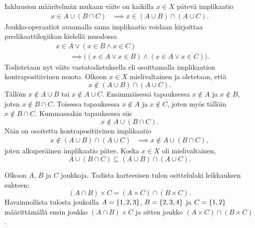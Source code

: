 \documentclass[12pt,a4paper]{article}
\begin{document}
\begin{solution}
Inkluusion määritelmän mukaan väite on kaikilla \(x \in X\) pätevä implikaatio
\[
\begin{aligned}
x \in A \cup (B \cap C)
&\implies x \in (A \cup B) \cap (A \cup C).
\end{aligned}
\]
Joukko-operaatiot avaamalla sama implikaatio voidaan kirjoittaa
predikaattilogiikan kielellä muodossa
\[
\begin{aligned}
&x \in A \lor (x \in B \land x \in C) \\
&\qquad\implies
\bigl((x \in A \lor x \in B) \land (x \in A \lor x \in C)\bigr).
\end{aligned}
\]
Todistetaan nyt väite vastatodistuksella eli osoittamalla implikaation
kontrapositiivinen muoto. Olkoon \(x \in X\) mielivaltainen ja oletetaan, että
\[
x \notin (A \cup B) \cap (A \cup C).
\]
Tällöin \(x \notin A \cup B\) tai \(x \notin A \cup C\). Ensimmäisessä
tapauksessa \(x \notin A\) ja \(x \notin B\), joten
\(x \notin B \cap C\). Toisessa tapauksessa \(x \notin A\) ja
\(x \notin C\), joten myös tällöin \(x \notin B \cap C\). Kummassakin
tapauksessa siis
\[
x \notin A \cup (B \cap C).
\]
Näin on osoitettu kontrapositiivinen implikaatio
\[
\begin{aligned}
x \notin (A \cup B) \cap (A \cup C)
&\implies x \notin A \cup (B \cap C),
\end{aligned}
\]
joten alkuperäinen implikaatio pätee.
Koska \(x \in X\) oli mielivaltainen,
\[A \cup (B \cap C) \subseteq (A \cup B) \cap (A \cup C).\]
\end{solution}

\begin{exercise}
Olkoon \(A\), \(B\) ja \(C\) joukkoja. Todista karteesisen tulon osittelulaki
leikkauksen suhteen:
\[
(A \cap B) \times C = (A \times C) \cap (B \times C).
\]
Havainnollista tulosta joukoilla \(A = \left\lbrace1, 2, 3\right\rbrace\), \(B = \left\lbrace2, 3, 4\right\rbrace\)
ja \(C = \left\lbrace1, 2\right\rbrace\) määrittämällä ensin joukko \((A \cap B) \times C\)
ja sitten joukko \((A \times C) \cap (B \times C)\).
\end{exercise}
\end{document}
